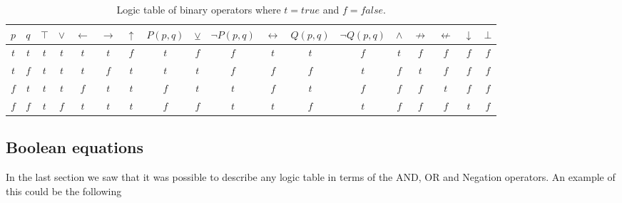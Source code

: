                 \begin{table}[h!]
                    \centering
                    \begin{tabular}{|c|c||c|c|c|c|c|c|c|c|c|c|c|c|c|c|c|c|}
                    	\hline
                    	$p$ & $q$ & $\top$ & $\vee$ & $\leftarrow$ & $\rightarrow$ & $\uparrow$ & $P(p,q)$ & $\veebar$ & $\neg P(p,q)$ & $\leftrightarrow$ & $Q(p, q)$ & $\neg Q(p,q)$ & $\wedge$ & $\not\rightarrow$ & $\not\leftarrow$ & $\downarrow$ & $\bot$ \\ \hline
                    	$t$ & $t$ &  $t$   &  $t$   &     $t$      &      $t$      &    $f$     &   $t$    &    $f$    &      $f$      &        $t$        &    $t$    &      $f$      &   $t$    &        $f$        &       $f$        &     $f$      &  $f$   \\ \hline
                    	$t$ & $f$ &  $t$   &  $t$   &     $t$      &      $f$      &    $t$     &   $t$    &    $t$    &      $f$      &        $f$        &    $f$    &      $t$      &   $f$    &        $t$        &       $f$        &     $f$      &  $f$   \\ \hline
                    	$f$ & $t$ &  $t$   &  $t$   &     $f$      &      $t$      &    $t$     &   $f$    &    $t$    &      $t$      &        $f$        &    $t$    &      $f$      &   $f$    &        $f$        &       $t$        &     $f$      &  $f$   \\ \hline
                    	$f$ & $f$ &  $t$   &  $f$   &     $t$      &      $t$      &    $t$     &   $f$    &    $f$    &      $t$      &        $t$        &    $f$    &      $t$      &   $f$    &        $f$        &       $f$        &     $t$      &  $f$   \\ \hline
                    \end{tabular} 
                    \caption{Logic table of binary operators where $t=true$ and $f=false$.} 
                    \label{LogicTable:BinaryOperators}
                \end{table}
        
        \subsection{Boolean equations}\label{Section:BooleanEquation}
        
            In the last section we saw that it was possible to describe any logic table in terms of the AND, OR and Negation operators. An example of this could be the following
            
